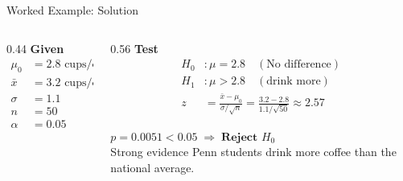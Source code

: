 \documentclass[aspectratio=169,11pt]{beamer}
\begin{document}
\begin{frame}{Worked Example: Solution}
  \small
  \begin{columns}[T]
    \begin{column}{0.44\textwidth}
      \textbf{\color{qrnavy}Given}
      \begin{align*}
        \mu_0 &= 2.8 \text{ cups/day}\\
        \bar{x} &= 3.2 \text{ cups/day}\\
        \sigma &= 1.1\\
        n &= 50\\
        \alpha &= 0.05
      \end{align*}
    \end{column}
    \begin{column}{0.56\textwidth}
      \textbf{\color{qrnavy}Test}
      \begin{align*}
        H_0&: \mu = 2.8 \quad(\text{No difference})\\
        H_1&: \mu > 2.8 \quad(\text{drink more})\\[0.4em]
        z &= \frac{\bar{x}-\mu_0}{\sigma/\sqrt{n}}
           = \frac{3.2-2.8}{1.1/\sqrt{50}} \approx 2.57
      \end{align*}
      \vspace{0.2em}
      \begin{tcolorbox}[colback=qrlight,colframe=qrred,arc=2pt,boxrule=0.6pt]
        $p = 0.0051 < 0.05 \;\Rightarrow\; \textbf{Reject } H_0$\\
        Strong evidence Penn students drink more coffee than the national average.
      \end{tcolorbox}
    \end{column}
  \end{columns}
\end{frame}
\end{document}
